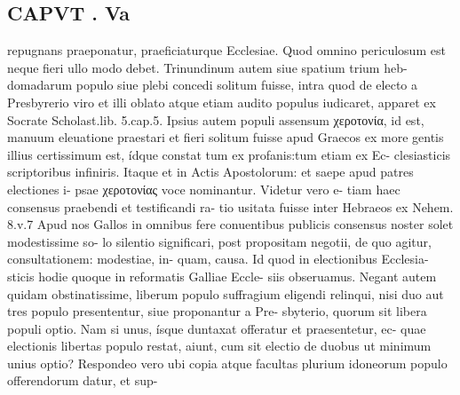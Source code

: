 \documentclass{article}
\begin{document}
\begin{pages}
\section*{CAPVT . Va }
\marginpar{[ p.355 ]}repugnans praeponatur, praeficiaturque Ecclesiae. Quod omnino periculosum est neque fieri ullo modo debet. Trinundinum autem siue spatium trium heb- domadarum populo siue plebi concedi solitum fuisse, intra quod de electo a Presbyrerio viro et illi oblato atque etiam audito populus iudicaret, apparet ex Socrate Scholast.lib. 5.cap.5. Ipsius autem populi assensum χεροτονία, id est, manuum eleuatione praestari et fieri solitum fuisse apud Graecos ex more gentis illius certissimum est, ídque constat tum ex profanis:tum etiam ex Ec- clesiasticis scriptoribus infiniris. Itaque et in Actis Apostolorum: et saepe apud patres electiones i- psae χεροτονίας voce nominantur. Videtur vero e- tiam haec consensus praebendi et testificandi ra- tio usitata fuisse inter Hebraeos ex Nehem. 8.v.7 Apud nos Gallos in omnibus fere conuentibus publicis consensus noster solet modestissime so- lo silentio significari, post propositam negotii, de quo agitur, consultationem: modestiae, in- quam, causa. Id quod in electionibus Ecclesia- sticis hodie quoque in reformatis Galliae Eccle- siis obseruamus. Negant autem quidam obstinatissime, liberum populo suffragium eligendi relinqui, nisi duo aut tres populo presententur, siue proponantur a Pre- sbyterio, quorum sit libera populi optio. Nam si unus, ísque duntaxat offeratur et praesentetur, ec- quae electionis libertas populo restat, aiunt, cum sit electio de duobus ut minimum unius optio? Respondeo vero ubi copia atque facultas plurium idoneorum populo offerendorum datur, et sup- 

\end{pages}
\end{document}
